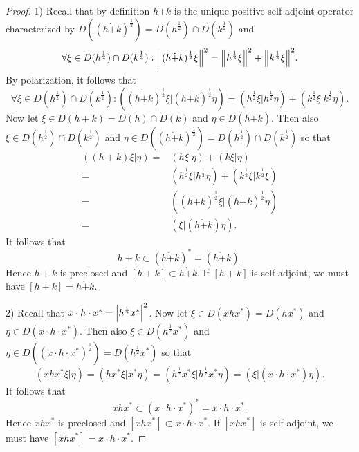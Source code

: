 \begin{proof}
    1) Recall that by definition $h\dot{+}k$ is the unique positive self-adjoint operator characterized by $D((h\dot{+}k)^\frac{1}{2})=D(h^\frac{1}{2})\cap D(k^\frac{1}{2})$ and
    \begin{equation}
        \forall \xi\in D(h^\frac{1}{2})\cap D(k^\frac{1}{2}):\norm{(h\dot{+}k)^\frac{1}{2}\xi}^2=\norm{h^\frac{1}{2}\xi}^2+\norm{k^\frac{1}{2}\xi}^2.
    \end{equation}
    By polarization, it follows that
    \[
        \forall \xi\in D(h^\frac{1}{2})\cap D(k^\frac{1}{2}):((h\dot{+}k)^\frac{1}{2}\xi|(h\dot{+}k)^\frac{1}{2}\eta)=(h^\frac{1}{2}\xi|h^\frac{1}{2}\eta)+(k^\frac{1}{2}\xi|k^\frac{1}{2}\eta).
    \]
    Now let $\xi\in D(h+k)=D(h)\cap D(k)$ and $\eta\in D(h\dot{+}k)$. Then also $\xi\in D(h^\frac{1}{2})\cap D(k^\frac{1}{2})$ and $\eta\in D((h\dot{+}k)^\frac{1}{2})=D(h^\frac{1}{2})\cap D(k^\frac{1}{2})$ so that
    \[
        \begin{split}
            ((h+k)\xi|\eta)=&(h\xi|\eta)+(k\xi|\eta)\\
            =&(h^\frac{1}{2}\xi|h^\frac{1}{2}\eta)+(k^\frac{1}{2}\xi|k^\frac{1}{2}\xi)\\
            =&((h\dot{+}k)^\frac{1}{2}\xi|(h\dot{+}k)^\frac{1}{2}\eta)\\
            =&(\xi|(h\dot{+}k)\eta).
        \end{split}
    \]
    It follows that
    \[
        h+k\subset (h\dot{+}k)^*=(h\dot{+}k).
    \]
    Hence $h+k$ is preclosed and $[h+k]\subset h\dot{+}k$. If $[h+k]$ is self-adjoint, we must have $[h+k]=h\dot{+}k$.\par
    2) Recall that $x\cdot h\cdot x^*=\abs{h^\frac{1}{2}x^*}^2$. Now let $\xi\in D(xhx^*)=D(hx^*)$ and $\eta\in D(x\cdot h\cdot x^*)$. Then also $\xi\in D(h^\frac{1}{2}x^*)$ and $\eta\in D((x\cdot h\cdot x^*)^\frac{1}{2})=D(h^\frac{1}{2}x^*)$ so that
    \[
        (xhx^* \xi|\eta)=(hx^*\xi|x^* \eta)=(h^\frac{1}{2}x^*\xi|h^\frac{1}{2}x^*\eta)=(\xi|(x\cdot h\cdot x^*)\eta).
    \]
    It follows that
    \[
        xhx^*\subset(x\cdot h\cdot x^*)^*=x\cdot h\cdot x^*.
    \]
    Hence $xhx^*$ is preclosed and $[xhx^*]\subset x\cdot h\cdot x^*$. If $[xhx^*]$ is self-adjoint, we must have $[xhx^*]=x\cdot h\cdot x^*$.
\end{proof}
